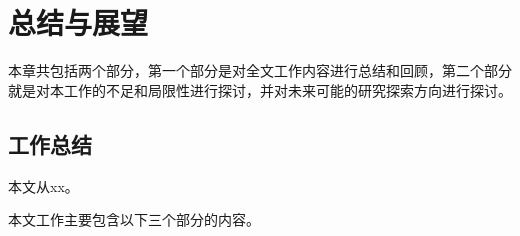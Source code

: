 
\chapter{总结与展望}

\indent 本章共包括两个部分，第一个部分是对全文工作内容进行总结和回顾，第二个部分就是对本工作的不足和局限性进行探讨，并对未来可能的研究探索方向进行探讨。

\section{工作总结}

\indent 本文从xx。

本文工作主要包含以下三个部分的内容。
